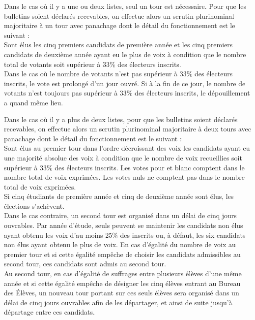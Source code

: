 \documentclass{article} %
\begin{document}
				Dans le cas où il y a une ou deux listes, seul un tour est nécessaire. Pour que les bulletins soient déclarés recevables, on effectue alors un
				scrutin plurinominal majoritaire à un tour avec panachage dont le détail du fonctionnement est le suivant :\\
				Sont élus les cinq premiers candidats de première année et les cinq premiers candidats de deuxième année ayant eu le plus de voix
				à condition que le nombre total de votants soit supérieur à 33\% des électeurs inscrits.\\
				Dans le cas où le nombre de votants n’est pas supérieur à 33\% des électeurs inscrits, le vote est prolongé d’un jour ouvré.
				Si à la fin de ce jour, le nombre de votants n’est toujours pas supérieur à 33\% des électeurs inscrits, le dépouillement a quand même lieu.

				Dans le cas où il y a plus de deux listes, pour que les bulletins soient déclarés recevables, on effectue alors un scrutin plurinominal majoritaire
				à deux tours avec panachage dont le détail du fonctionnement est le suivant :\\
				Sont élus au premier tour dans l’ordre décroissant des voix les candidats ayant eu une majorité absolue des voix à condition que le nombre de voix
				recueillies soit supérieur à 33\% des électeurs inscrits. Les votes pour et blanc comptent dans le nombre total de voix exprimées.
				Les votes nuls ne comptent pas dans le nombre total de voix exprimées.\\
				Si cinq étudiants de première année et cinq de deuxième année sont élus, les élections s’achèvent.\\
				Dans le cas contraire, un second tour est organisé dans un délai de cinq jours ouvrables. Par année d’étude, seuls peuvent se maintenir
				les candidats non élus ayant obtenu les voix d’au moins 25\% des inscrits ou, à défaut, les six candidats non élus ayant obtenu le plus de voix.
				En cas d’égalité du nombre de voix au premier tour et si cette égalité empêche de choisir les candidats admissibles au second tour, ces candidats sont admis au second tour.\\
				Au second tour, en cas d'égalité de suffrages entre plusieurs élèves d'une même année et si cette égalité empêche de désigner les cinq élèves entrant
				au Bureau des Élèves, un nouveau tour portant sur ces seuls élèves sera organisé dans un délai de cinq jours ouvrables afin de les départager,
				et ainsi de suite jusqu’à départage entre ces candidats.
\end{document}
